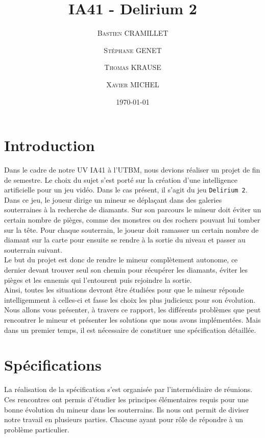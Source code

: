 \documentclass[a4paper,11pt]{article}
\title{IA41 - Delirium 2}
\author{
\textsc{Bastien CRAMILLET}
\and
\textsc{St\'ephane GENET}
\and
\textsc{Thomas KRAUSE}
\and
\textsc{Xavier MICHEL}
}
\date{\today}
\begin{document}
\maketitle
\newpage
{}%
\newpage



	\section{Introduction}
	
Dans le cadre de notre UV IA41 \`a l'UTBM, nous devions r\'ealiser un projet de fin de semestre. Le choix du sujet s'est port\'e sur la cr\'eation d'une intelligence artificielle pour un jeu vid\'eo. 
Dans le cas pr\'esent, il s'agit du jeu \texttt{Delirium 2}. Dans ce jeu, le joueur dirige un mineur se d\'epla\c cant dans des galeries souterraines \`a la recherche de diamants. Sur son parcours le mineur doit \'eviter un certain nombre de pi\`eges, comme des monstres ou des rochers pouvant lui tomber sur la t\^ete. Pour chaque souterrain, le joueur doit ramasser un certain nombre de diamant sur la carte pour ensuite se rendre \`a la sortie du niveau et passer au souterrain suivant.\\

Le but du projet est donc de rendre le mineur compl\`etement autonome, ce dernier devant trouver seul son chemin pour r\'ecup\'erer les diamants, \'eviter les pi\`eges et les ennemis qui l'entourent puis rejoindre la sortie.\\

Ainsi, toutes les situations devront \^etre \'etudi\'ees pour que le mineur r\'eponde intelligemment \`a celles-ci et fasse les choix les plus judicieux pour son \'evolution.\\

Nous allons vous pr\'esenter, \`a travers ce rapport, les diff\'erents probl\`emes que peut rencontrer le mineur et pr\'esenter les solutions que nous avons impl\'ement\'ees. Mais dans un premier temps, il est n\'ecessaire de constituer une sp\'ecification d\'etaill\'ee.
	
	\newpage
	\section{Sp\'ecifications}
	
La r\'ealisation de la sp\'ecification s'est organis\'ee par l'interm\'ediaire de r\'eunions. Ces rencontres ont permis d'\'etudier les principes \'el\'ementaires requis pour une bonne \'evolution du mineur dans les souterrains. Ils nous ont permit de diviser notre travail en plusieurs parties. Chacune ayant pour r\^ole de r\'epondre \`a un probl\`eme particulier.\\
\end{document}
